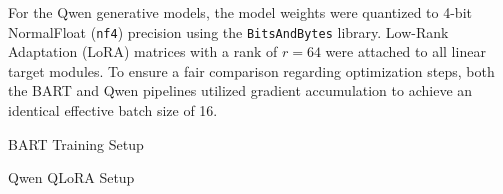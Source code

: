 \documentclass[11pt]{extarticle}
\begin{document}
For the Qwen generative models, the model weights were quantized to 4-bit NormalFloat (\texttt{nf4}) precision using the \texttt{BitsAndBytes} library. Low-Rank Adaptation (LoRA) matrices with a rank of $r=64$ were attached to all linear target modules. To ensure a fair comparison regarding optimization steps, both the BART and Qwen pipelines utilized gradient accumulation to achieve an identical effective batch size of 16.

\begin{table}[H]
    \centering
    
    \begin{subtable}{0.48\textwidth}
        \centering
        \renewcommand{\arraystretch}{1.2}
        \caption{BART Training Setup}
    \end{subtable}\hfill
    \begin{subtable}{0.48\textwidth}
        \centering
        \renewcommand{\arraystretch}{1.2}
        \caption{Qwen QLoRA Setup}
    \end{subtable}
    \caption{Core hyperparameters utilized during the fine-tuning process.}
    \label{tab:hyperparameters}
\end{table}
\end{document}
